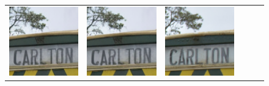 \begin{figure}[!ht]
\begin{tabular}[t]{c c c c c c}
    \includegraphics[width=\xwidth]{cp2/figures/sr/scaling_sr_c512_2.png} &
    \includegraphics[width=\xwidth]{cp2/figures/sr/scaling_sr_c512_2.png} &
    \includegraphics[width=\xwidth]{cp2/figures/sr/scaling_sr_hr_2.png}

\end{tabular}
\end{figure}
